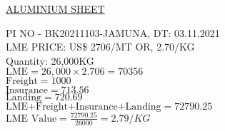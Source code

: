 \documentclass[12pt]{article}
\begin{document}
\begin{center}
\underline{ALUMINIUM SHEET}
\\
\end{center}
PI NO - BK20211103-JAMUNA, DT: 03.11.2021
\\
LME PRICE: US\$ 2706/MT OR, 2.70/KG
\\
Quantity: 26,000KG
\\
$\textrm{LME}= 26,000 \times 2.706 = 70356$
\\
$\textrm{Freight} = 1000$
\\
$\textrm{Insurance} = 713.56$
\\
$\textrm{Landing} = 720.69$
\\
$\textrm{LME+Freight+Insurance+Landing} = 72790.25$
\\
$\textrm{LME Value}  = \frac{72790.25}{26000} = 2.79/KG$
\end{document}
